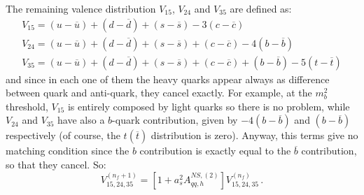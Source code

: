 \documentclass[10pt,a4paper]{article}
\begin{document}
The remaining valence distribution $V_{15}$, $V_{24}$ and $V_{35}$ are
defined as:
\begin{equation}
\begin{array}{l}
V_{15}=(u-\overline{u})+(d-\overline{d})+(s-\overline{s})-3(c-\overline{c})\\
V_{24}=(u-\overline{u})+(d-\overline{d})+(s-\overline{s})+(c-\overline{c})-4(b-\overline{b})\\
V_{35}=(u-\overline{u})+(d-\overline{d})+(s-\overline{s})+(c-\overline{c})+(b-\overline{b})-5(t-\overline{t})
\end{array}
\end{equation}
and since in each one of them the heavy quarks appear always as
difference between quark and anti-quark, they cancel exactly. For
example, at the $m_b^2$ threshold, $V_{15}$ is entirely composed by
light quarks so there is no problem, while $V_{24}$ and $V_{35}$ have
also a $b$-quark contribution, given by $-4(b-\overline{b})$ and
$(b-\overline{b})$ respectively (of course, the $t(\overline{t})$
distribution is zero). Anyway, this terms give no matching condition
since the $b$ contribution is exactly equal to the $\overline{b}$
contribution, so that they cancel. So:
\begin{equation}
V_{15,24,35}^{(n_f+1)}=[1+a_s^2A_{qq,h}^{N\!S,(2)}]V^{(n_f)}_{15,24,35}\,.
\label{v152435}
\end{equation}
\end{document}
